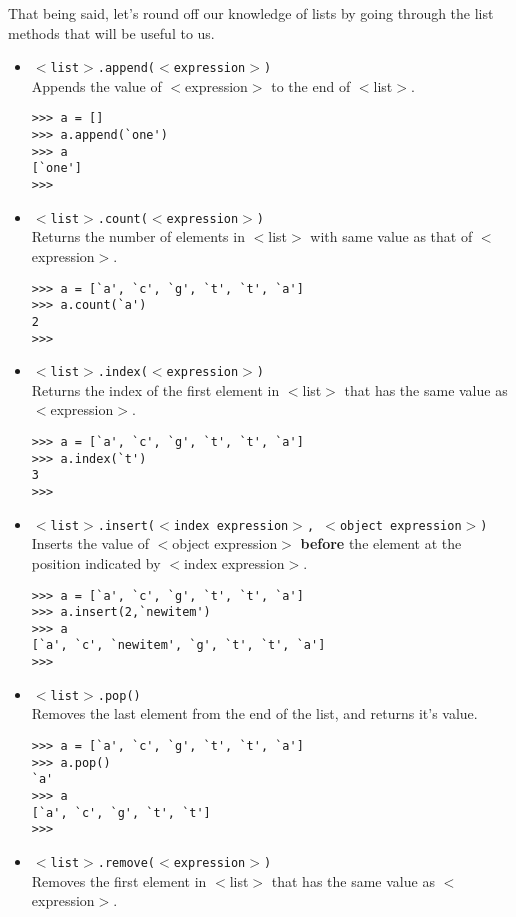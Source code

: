 That being said, let's round off our knowledge of lists by   going through the list methods that will be useful to us.
\begin{itemize}
	\item 
\texttt{$<$list$>$.append($<$expression$>$)}
\\     Appends the value of $<$expression$>$ to the end of     $<$list$>$.      
\begin{lstlisting}
>>> a = []
>>> a.append(`one')
>>> a
[`one']
>>>
\end{lstlisting}
	\item 
\texttt{$<$list$>$.count($<$expression$>$)}
\\     Returns the number of elements in $<$list$>$ with same value     as that of $<$expression$>$.      
\begin{lstlisting}
>>> a = [`a', `c', `g', `t', `t', `a']
>>> a.count(`a')
2
>>>
\end{lstlisting}
	\item 
\texttt{$<$list$>$.index($<$expression$>$)}
\\     Returns the index of the first element in $<$list$>$ that has     the same value as $<$expression$>$.      
\begin{lstlisting}
>>> a = [`a', `c', `g', `t', `t', `a']
>>> a.index(`t')
3
>>>
\end{lstlisting}
	\item 
\texttt{$<$list$>$.insert($<$index expression$>$, $<$object     expression$>$)}
\\ Inserts the value of $<$object     expression$>$ \textbf{before} the element at the     position indicated by $<$index expression$>$.      
\begin{lstlisting}
>>> a = [`a', `c', `g', `t', `t', `a']
>>> a.insert(2,`newitem')
>>> a
[`a', `c', `newitem', `g', `t', `t', `a']
>>>
\end{lstlisting}
	\item 
\texttt{$<$list$>$.pop()}
\\ Removes the last element     from the end of the list, and returns it's value.      
\begin{lstlisting}
>>> a = [`a', `c', `g', `t', `t', `a']
>>> a.pop()
`a'
>>> a
[`a', `c', `g', `t', `t']
>>>
\end{lstlisting}
	\item 
\texttt{$<$list$>$.remove($<$expression$>$)}
\\     Removes the first element in $<$list$>$ that has the same     value as $<$expression$>$.      
\begin{lstlisting}

\end{lstlisting}
\end{itemize}
